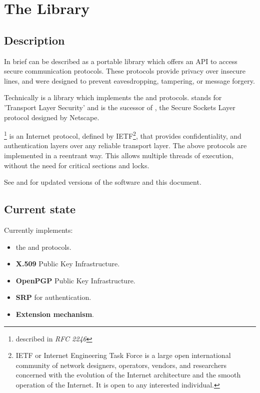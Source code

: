 \chapter{The Library}

\section{Description}
\par
In brief \gnutls{} can be described as a portable library which offers
an API to access secure communication protocols. These protocols provide
privacy over insecure lines, and were designed to prevent 
eavesdropping, tampering, or message forgery.

\par
Technically \gnutls{} is a library which implements the \tlsI{} and 
\sslIII{} protocols.
\tls{} stands for 'Transport Layer Security' and is the sucessor of \ssl{}, 
the Secure Sockets Layer protocol designed by Netscape. 

\tlsI{}\footnote{described in {\it RFC 2246}} is an Internet protocol,
defined by {IETF}\footnote{IETF or Internet Engineering Task Force 
is a large open international community of network
designers, operators, vendors, and researchers concerned with the evolution of 
the Internet architecture and the smooth operation of the Internet. It is open to any interested individual.}, 
that provides confidentiality, and authentication layers over any reliable
transport layer.
The above protocols are implemented in a reentrant way. 
This allows multiple threads of execution, without the need for critical 
sections and locks. 

\par
See 
and  
for updated versions of the \gnutls{} software and this document.

\section{Current state}

Currently \gnutls{} implements:
\begin{itemize}
\item the \tlsI{} and \sslIII{} protocols.
\item {\bf X.509} Public Key Infrastructure.
\item {\bf OpenPGP} Public Key Infrastructure.
\item {\bf SRP} for \tls{} authentication.
\item \tls{} {\bf Extension mechanism}.
\end{itemize}


